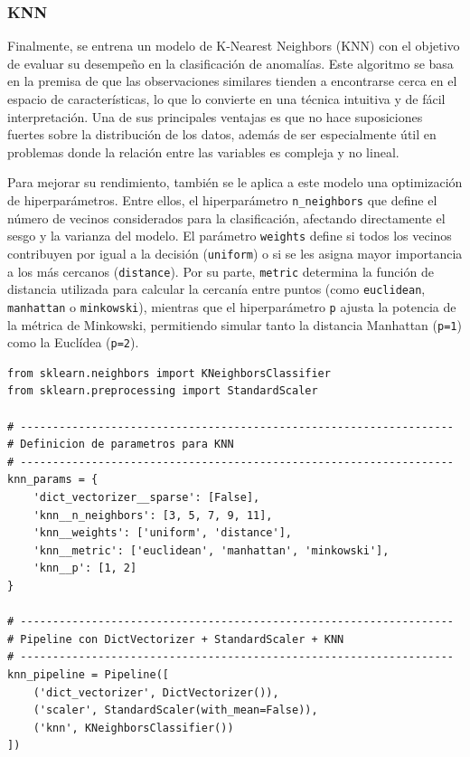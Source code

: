 \documentclass[11pt,a4paper,spanish]{book}
\numberwithin{equation}{chapter}
\numberwithin{figure}{chapter}
\begin{document}
\subsubsection{KNN}

Finalmente, se entrena un modelo de K-Nearest Neighbors (KNN) con el objetivo de evaluar su desempeño en la clasificación de anomalías. Este algoritmo se basa en la premisa de que las observaciones similares tienden a encontrarse cerca en el espacio de características, lo que lo convierte en una técnica intuitiva y de fácil interpretación. Una de sus principales ventajas es que no hace suposiciones fuertes sobre la distribución de los datos, además de ser especialmente útil en problemas donde la relación entre las variables es compleja y no lineal.

Para mejorar su rendimiento, también se le aplica a este modelo una optimización de hiperparámetros. Entre ellos, el hiperparámetro \lstinline|n_neighbors| que define el número de vecinos considerados para la clasificación, afectando directamente el sesgo y la varianza del modelo. El parámetro \lstinline|weights| define si todos los vecinos contribuyen por igual a la decisión (\lstinline|uniform|) o si se les asigna mayor importancia a los más cercanos (\lstinline|distance|). Por su parte, \lstinline|metric| determina la función de distancia utilizada para calcular la cercanía entre puntos (como \lstinline|euclidean|, \lstinline|manhattan| o \lstinline|minkowski|), mientras que el hiperparámetro \lstinline|p| ajusta la potencia de la métrica de Minkowski, permitiendo simular tanto la distancia Manhattan (\lstinline|p=1|) como la Euclídea (\lstinline|p=2|). 


\vspace{5mm}
\begin{lstlisting}
from sklearn.neighbors import KNeighborsClassifier
from sklearn.preprocessing import StandardScaler

# -------------------------------------------------------------------
# Definicion de parametros para KNN
# -------------------------------------------------------------------
knn_params = {
    'dict_vectorizer__sparse': [False],
    'knn__n_neighbors': [3, 5, 7, 9, 11],     
    'knn__weights': ['uniform', 'distance'],  
    'knn__metric': ['euclidean', 'manhattan', 'minkowski'],  
    'knn__p': [1, 2]  
}

# -------------------------------------------------------------------
# Pipeline con DictVectorizer + StandardScaler + KNN
# -------------------------------------------------------------------
knn_pipeline = Pipeline([
    ('dict_vectorizer', DictVectorizer()),
    ('scaler', StandardScaler(with_mean=False)),  
    ('knn', KNeighborsClassifier())
])
\end{lstlisting}
\end{document}
